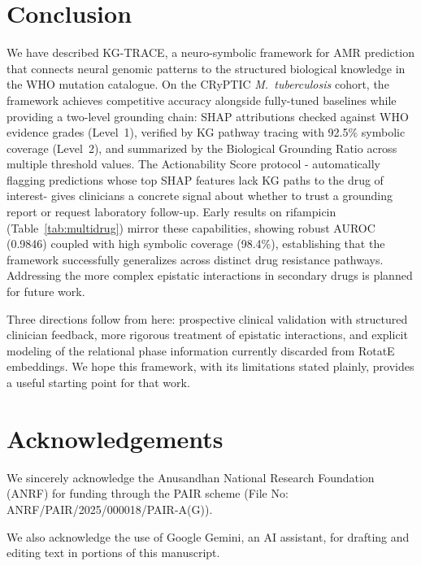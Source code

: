 \documentclass[conference]{IEEEtran}
\begin{document}
\section{Conclusion}\label{sec:conclusion}

We have described KG-TRACE, a neuro-symbolic framework for AMR prediction that connects neural genomic patterns to the structured biological knowledge in the WHO mutation catalogue. On the CRyPTIC \textit{M.~tuberculosis} cohort, the framework achieves competitive accuracy alongside fully-tuned baselines while providing a two-level grounding chain: SHAP attributions checked against WHO evidence grades (Level~1), verified by KG pathway tracing with 92.5\% symbolic coverage (Level~2), and summarized by the Biological Grounding Ratio across multiple threshold values. The Actionability Score protocol - automatically flagging predictions whose top SHAP features lack KG paths to the drug of interest- gives clinicians a concrete signal about whether to trust a grounding report or request laboratory follow-up. Early results on rifampicin (Table~\ref{tab:multidrug}) mirror these capabilities, showing robust AUROC (0.9846) coupled with high symbolic coverage (98.4\%), establishing that the framework successfully generalizes across distinct drug resistance pathways. Addressing the more complex epistatic interactions in secondary drugs is planned for future work.

Three directions follow from here: prospective clinical validation with structured clinician feedback, more rigorous treatment of epistatic interactions, and explicit modeling of the relational phase information currently discarded from RotatE embeddings. We hope this framework, with its limitations stated plainly, provides a useful starting point for that work.

\section*{Acknowledgements}

We sincerely acknowledge the Anusandhan National Research Foundation (ANRF) for funding through the PAIR scheme (File No: ANRF/PAIR/2025/000018/PAIR-A(G)).

We also acknowledge the use of Google Gemini, an AI assistant, for drafting and editing text in portions of this manuscript.


\end{document}
